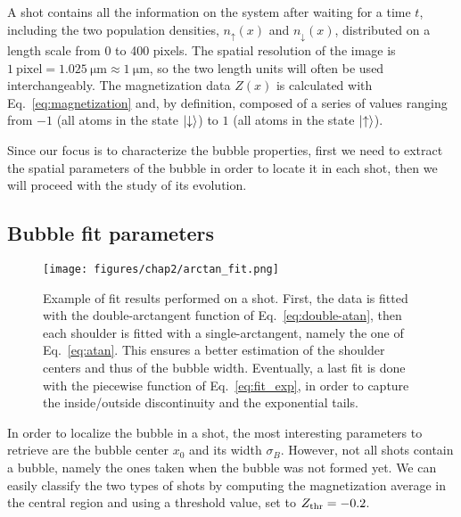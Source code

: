 A shot contains all the information on the system after waiting for a time $t$, including the two population densities, $n_\uparrow(x)$ and $n_\downarrow(x)$, distributed on a length scale from 0 to 400 pixels. The spatial resolution of the image is $1\ \text{pixel} = 1.025\ \unit{\micro\meter} \approx 1\ \unit{\micro\meter}$, so the two length units will often be used interchangeably. The magnetization data $Z(x)$ is calculated with Eq.\ \eqref{eq:magnetization} and, by definition, composed of a series of values ranging from $-1$ (all atoms in the state $\ket{\downarrow}$) to $1$ (all atoms in the state $\ket{\uparrow}$).

Since our focus is to characterize the bubble properties, first we need to extract the spatial parameters of the bubble in order to locate it in each shot, then we will proceed with the study of its evolution.

\subsection{Bubble fit parameters}
\begin{figure}[ht!]
    \centering
    \texttt{[image: figures/chap2/arctan\_fit.png]}
    \caption{Example of fit results performed on a shot. First, the data is fitted with the double-arctangent function of Eq.\ \eqref{eq:double-atan}, then each shoulder is fitted with a single-arctangent, namely the one of Eq.\ \eqref{eq:atan}. This ensures a better estimation of the shoulder centers and thus of the bubble width. Eventually, a last fit is done with the piecewise function of Eq.\ \eqref{eq:fit_exp}, in order to capture the inside/outside discontinuity and the exponential tails.}
    \label{fig:atan-fit}
\end{figure}
In order to localize the bubble in a shot, the most interesting parameters to retrieve are the bubble center $x_0$ and its width $\sigma_B$.
However, not all shots contain a bubble, namely the ones taken when the bubble was not formed yet. We can easily classify the two types of shots by computing the magnetization average in the central region and using a threshold value, set to $Z_{\rm thr} = -0.2$. 

